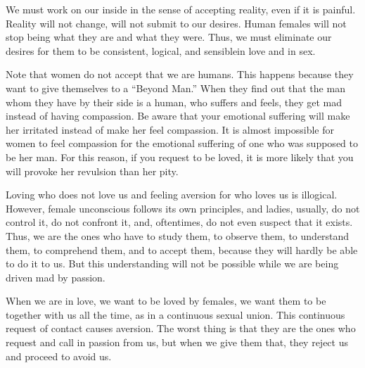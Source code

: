 
\par We must work on our inside in the sense of accepting reality, even if it is painful. Reality will not change, will not submit to our desires. Human females will not stop being what they are and what they were. Thus, we must eliminate our desires for them to be consistent, logical, and sensible\footnotemark[3] in love and in sex.


\par Note that women do not accept that we are humans. This happens because they want to give themselves to a \enquote{Beyond Man.} When they find out that the man whom they have by their side is a human, who suffers and feels, they get mad instead of having compassion. Be aware that your emotional suffering will make her irritated instead of make her feel compassion. It is almost impossible for women to feel compassion for the emotional suffering of one who was supposed to be her man. For this reason, if you request to be loved, it is more likely that you will provoke her revulsion than her pity.

\par Loving who does not love us and feeling aversion for who loves us is illogical. However, female unconscious follows its own principles, and ladies, usually, do not control it, do not confront it, and, oftentimes, do not even suspect that it exists\footnotemark[4]. Thus, we are the ones who have to study them, to observe them, to understand them, to comprehend them, and to accept them, because they will hardly be able to do it to us. But this understanding will not be possible while we are being driven mad by passion.


\par When we are in love, we want to be loved by females, we want them to be together with us all the time, as in a continuous sexual union. This continuous request of contact causes aversion. The worst thing is that they are the ones who request and call in passion from us, but when we give them that, they reject us and proceed to avoid us.

